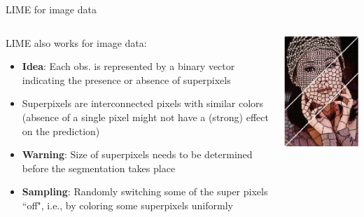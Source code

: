 \documentclass[11pt,compress,t,notes=noshow, aspectratio=169, xcolor=table]{beamer}
\begin{document}
\begin{frame}{LIME for image data}
	\begin{columns}[totalwidth=\textwidth]
		\begin{column}{0.67\textwidth}
			LIME also works for image data:  
			\begin{itemize}
				\item \textbf{Idea}: Each obs. is represented by a binary vector indicating the presence or absence of superpixels 
				\item Superpixels are interconnected pixels with similar colors (absence of a single pixel might not have a (strong) effect on the prediction)
				\item \textbf{Warning}: Size of superpixels needs to be determined before the segmentation takes place
				\item \textbf{Sampling}: Randomly switching some of the super pixels ``off", i.e., by coloring some superpixels uniformly
			\end{itemize}		
		\end{column}
		\begin{column}{0.26\textwidth}  
			\begin{center}
				\includegraphics[width=1\textwidth]{figure/superpixel_woman}

\end{center}
\end{column}
\end{columns}
\end{frame}
\end{document}
